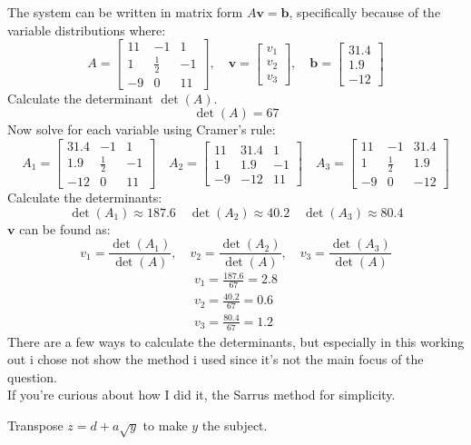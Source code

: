 \documentclass[a4paper, 12pt]{report}
\begin{document}
    The system can be written in matrix form \( A\mathbf{v} = \mathbf{b} \), specifically because of the variable distributions where:
    \[A = \begin{bmatrix} 11 & -1 & 1 \\ 1 & \frac{1}{2} & -1 \\ -9 & 0 & 11 \end{bmatrix}, \quad \mathbf{v} = \begin{bmatrix} v_1 \\ v_2 \\ v_3 \end{bmatrix}, \quad \mathbf{b} = \begin{bmatrix} 31.4 \\ 1.9 \\ -12 \end{bmatrix}\]
    Calculate the determinant \(\det(A)\).
    \[\det(A) = 67\]
    Now solve for each variable using Cramer's rule:
    \[A_1 = \begin{bmatrix} 31.4 & -1 & 1 \\ 1.9 & \frac{1}{2} & -1 \\ -12 & 0 & 11 \end{bmatrix}
    \quad 
    A_2 = \begin{bmatrix} 11 & 31.4 & 1 \\ 1 & 1.9 & -1 \\ -9 & -12 & 11 \end{bmatrix}
    \quad 
    A_3 = \begin{bmatrix} 11 & -1 & 31.4 \\ 1 & \frac{1}{2} & 1.9 \\ -9 & 0 & -12 \end{bmatrix}\]
    Calculate the determinants:
    \[\det(A_1)\approx187.6 \quad \det(A_2)\approx40.2\quad \det(A_3)\approx80.4\]
    \(\mathbf{v}\) can be found as:
    \[v_1 = \frac{\det(A_1)}{\det(A)}, \quad v_2 = \frac{\det(A_2)}{\det(A)}, \quad v_3 = \frac{\det(A_3)}{\det(A)}\]
    \[\boxed{\begin{array}{rcl}v_1=\frac{187.6}{67}=2.8\\[6pt]v_2=\frac{40.2}{67}=0.6\\[6pt]v_3=\frac{80.4}{67}=1.2\end{array}}\]
    There are a few ways to calculate the determinants, but especially in this working out i chose not show the method i used since it’s not the main focus of the question.\\[6pt]
    If you’re curious about how I did it, the Sarrus method for simplicity.
    \newpage    
    \begin{tcolorbox}[title=\color{black}{\section{Q6}}, colback=white, colframe=black!30!white, boxrule=0.4mm, width=1\textwidth]
        Transpose \( z = d + a \sqrt{y} \) to make \( y \) the subject.
    \end{tcolorbox}
\end{document}
